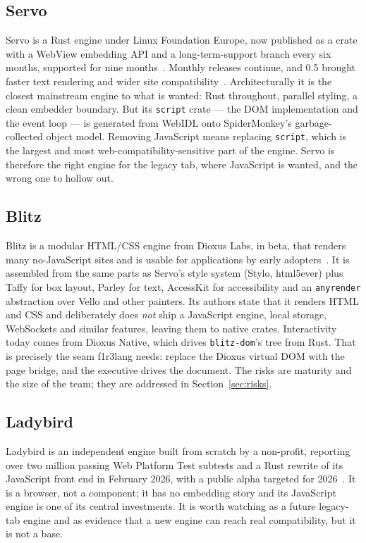 \documentclass[11pt]{article}
\theoremstyle{definition}
\theoremstyle{remark}
\newcommand{\fl}{f1r3lang}
\newcommand{\code}[1]{\texttt{#1}}
\begin{document}
\subsection{Servo}
Servo is a Rust engine under Linux Foundation Europe, now published as a crate with
a WebView embedding API and a long-term-support branch every six months, supported
for nine months~\cite{servolts}. Monthly releases continue, and 0.5 brought faster
text rendering and wider site compatibility~\cite{servo05}. Architecturally it is the
closest mainstream engine to what is wanted: Rust throughout, parallel styling, a
clean embedder boundary. But its \code{script} crate --- the DOM implementation and
the event loop --- is generated from WebIDL onto SpiderMonkey's garbage-collected
object model. Removing JavaScript means replacing \code{script}, which is the largest
and most web-compatibility-sensitive part of the engine. Servo is therefore the right
engine for the legacy tab, where JavaScript is wanted, and the wrong one to hollow
out.

\subsection{Blitz}
Blitz is a modular HTML/CSS engine from Dioxus Labs, in beta, that renders many
no-JavaScript sites and is usable for applications by early adopters~\cite{blitz}.
It is assembled from the same parts as Servo's style system (Stylo, html5ever) plus
Taffy for box layout, Parley for text, AccessKit for accessibility and an
\code{anyrender} abstraction over Vello and other painters. Its authors state that
it renders HTML and CSS and deliberately does \emph{not} ship a JavaScript engine,
local storage, WebSockets and similar features, leaving them to native crates.
Interactivity today comes from Dioxus Native, which drives \code{blitz-dom}'s tree
from Rust. That is precisely the seam \fl{} needs: replace the Dioxus virtual DOM
with the page bridge, and the executive drives the document. The risks are maturity
and the size of the team; they are addressed in Section~\ref{sec:risks}.

\subsection{Ladybird}
Ladybird is an independent engine built from scratch by a non-profit, reporting over
two million passing Web Platform Test subtests and a Rust rewrite of its JavaScript
front end in February 2026, with a public alpha targeted for 2026~\cite{ladybird}.
It is a browser, not a component; it has no embedding story and its JavaScript engine
is one of its central investments. It is worth watching as a future legacy-tab engine
and as evidence that a new engine can reach real compatibility, but it is not a base.
\end{document}
